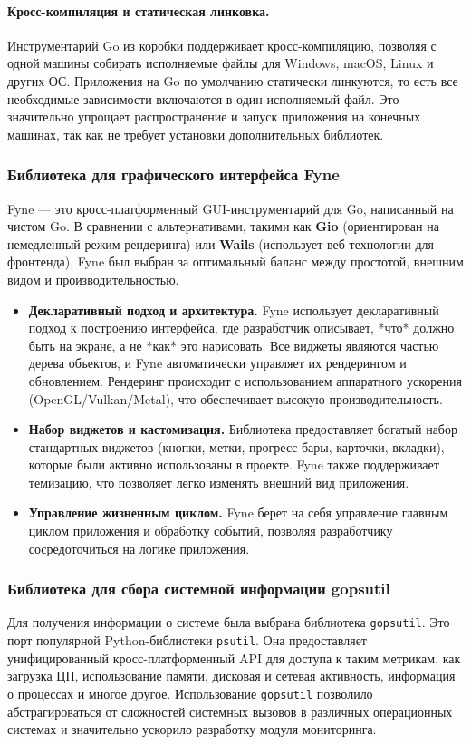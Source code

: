 \paragraph{Кросс-компиляция и статическая линковка.} Инструментарий Go из коробки поддерживает кросс-компиляцию, позволяя с одной машины собирать исполняемые файлы для Windows, macOS, Linux и других ОС. Приложения на Go по умолчанию статически линкуются, то есть все необходимые зависимости включаются в один исполняемый файл. Это значительно упрощает распространение и запуск приложения на конечных машинах, так как не требует установки дополнительных библиотек.

\subsubsection{Библиотека для графического интерфейса Fyne}

Fyne — это кросс-платформенный GUI-инструментарий для Go, написанный на чистом Go. В сравнении с альтернативами, такими как \textbf{Gio} (ориентирован на немедленный режим рендеринга) или \textbf{Wails} (использует веб-технологии для фронтенда), Fyne был выбран за оптимальный баланс между простотой, внешним видом и производительностью.

\begin{itemize}
    \item \textbf{Декларативный подход и архитектура.} Fyne использует декларативный подход к построению интерфейса, где разработчик описывает, *что* должно быть на экране, а не *как* это нарисовать. Все виджеты являются частью дерева объектов, и Fyne автоматически управляет их рендерингом и обновлением. Рендеринг происходит с использованием аппаратного ускорения (OpenGL/Vulkan/Metal), что обеспечивает высокую производительность.
    \item \textbf{Набор виджетов и кастомизация.} Библиотека предоставляет богатый набор стандартных виджетов (кнопки, метки, прогресс-бары, карточки, вкладки), которые были активно использованы в проекте. Fyne также поддерживает темизацию, что позволяет легко изменять внешний вид приложения.
    \item \textbf{Управление жизненным циклом.} Fyne берет на себя управление главным циклом приложения и обработку событий, позволяя разработчику сосредоточиться на логике приложения.
\end{itemize}

\subsubsection{Библиотека для сбора системной информации gopsutil}

Для получения информации о системе была выбрана библиотека \texttt{gopsutil}. Это порт популярной Python-библиотеки \texttt{psutil}. Она предоставляет унифицированный кросс-платформенный API для доступа к таким метрикам, как загрузка ЦП, использование памяти, дисковая и сетевая активность, информация о процессах и многое другое. Использование \texttt{gopsutil} позволило абстрагироваться от сложностей системных вызовов в различных операционных системах и значительно ускорило разработку модуля мониторинга.

